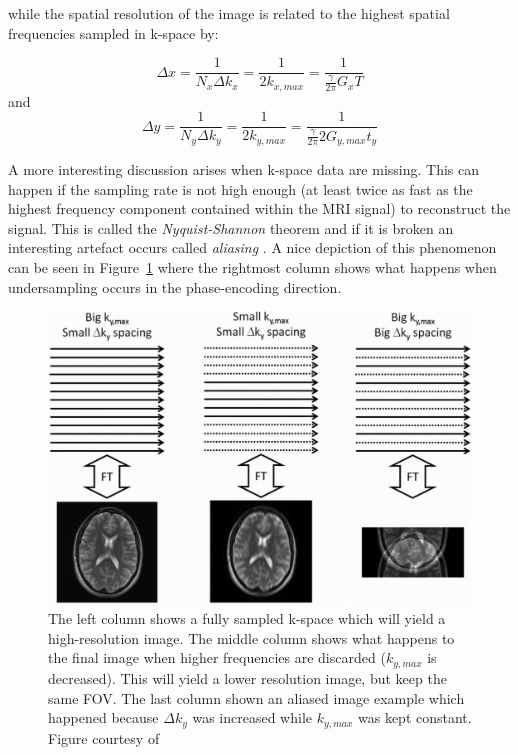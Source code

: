 while the spatial resolution of the image is related to the highest spatial frequencies sampled in k-space by:

\begin{equation} \label{eq:272}
    \Delta x = \frac{1}{N_x \Delta k_x} = \frac{1}{2 k_{x,max}} = \frac{1}{\frac{\gamma}{2 \pi} G_x T}
\end{equation}
and
\begin{equation} \label{eq:273}
    \Delta y = \frac{1}{N_y \Delta k_y} = \frac{1}{2 k_{y,max}} = \frac{1}{\frac{\gamma}{2 \pi} 2 G_{y,max} t_y}
\end{equation}

A more interesting discussion arises when k-space data are missing. This can happen if the sampling rate is not high enough (at least twice as fast as the highest frequency component contained within the MRI signal) to reconstruct the signal. This is called the \textit{Nyquist-Shannon} theorem and if it is broken an interesting artefact occurs called \textit{aliasing} \cite{Deshmane2012}. A nice depiction of this phenomenon can be seen in Figure~\ref{fig:partialkspace} where the rightmost column shows what happens when undersampling occurs in the phase-encoding direction.

\begin{figure}[ht]
    \centering
    \includegraphics[width=1\textwidth,keepaspectratio]{partialkspace}
    \caption{The left column shows a fully sampled k-space which will yield a high-resolution image. The middle column shows what happens to the final image when higher frequencies are discarded ($k_{y,max}$ is decreased). This will yield a lower resolution image, but keep the same FOV. The last column shown an aliased image example which happened because $\Delta k_y$ was increased while $k_{y,max}$ was kept constant. Figure courtesy of \cite{Deshmane2012}}
    \label{fig:partialkspace}
\end{figure}

